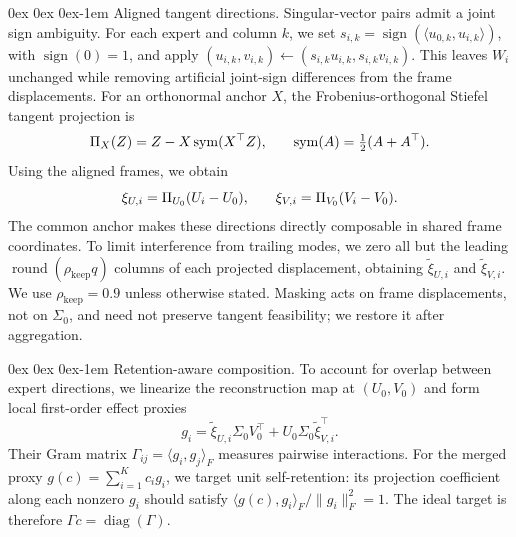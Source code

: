 \documentclass[11pt, a4paper]{utda}
\makeatletter
\renewcommand{\paragraph}{%
  \@startsection{paragraph}{4}%
  {\z@}{0ex \@plus 0ex \@minus 0ex}{-1em}%
  {\normalfont\normalsize\bfseries}%
}
\theoremstyle{plain}
\theoremstyle{definition}
\theoremstyle{remark}
\makeatother
\begin{document}
\paragraph{Aligned tangent directions.}
Singular-vector pairs admit a joint sign ambiguity.
For each expert and column $k$, we set
$s_{i,k}=\operatorname{sign}(\langle u_{0,k},u_{i,k}\rangle)$,
with $\operatorname{sign}(0)=1$, and apply
$(u_{i,k},v_{i,k})\leftarrow
(s_{i,k}u_{i,k},s_{i,k}v_{i,k})$.
This leaves $W_i$ unchanged while removing artificial joint-sign
differences from the frame displacements.
For an orthonormal anchor $X$, the Frobenius-orthogonal
Stiefel tangent projection is
\begin{equation}
\small
\label{eq:iso_main_tangent_projection}
    \Pi_X(Z)=Z-X\operatorname{sym}(X^\top Z),
    \qquad
    \operatorname{sym}(A)=\tfrac12(A+A^\top).
\end{equation}
Using the aligned frames, we obtain
\begin{equation}
\small
\label{eq:iso_merger_tangent_directions}
    \xi_{U,i}=\Pi_{U_0}(U_i-U_0),
    \qquad
    \xi_{V,i}=\Pi_{V_0}(V_i-V_0).
\end{equation}
The common anchor makes these directions directly composable
in shared frame coordinates.
To limit interference from trailing modes, we zero all but the
leading $\operatorname{round}(\rho_{\mathrm{keep}}q)$ columns
of each projected displacement, obtaining
$\widetilde\xi_{U,i}$ and $\widetilde\xi_{V,i}$.
We use $\rho_{\mathrm{keep}}=0.9$ unless otherwise stated.
Masking acts on frame displacements, not on $\Sigma_0$,
and need not preserve tangent feasibility; we restore it
after aggregation.

\paragraph{Retention-aware composition.}
To account for overlap between expert directions, we linearize
the reconstruction map at $(U_0,V_0)$ and form local
first-order effect proxies
\begin{equation}
\label{eq:iso_merger_effect_proxy}
    g_i=\widetilde\xi_{U,i}\Sigma_0V_0^\top
        +U_0\Sigma_0\widetilde\xi_{V,i}^\top.
\end{equation}
Their Gram matrix
$\Gamma_{ij}=\langle g_i,g_j\rangle_F$
measures pairwise interactions.
For the merged proxy $g(c)=\sum_{i=1}^{K}c_i g_i$, we target
unit self-retention: its projection coefficient along each
nonzero $g_i$ should satisfy
$\langle g(c),g_i\rangle_F/\|g_i\|_F^2=1$.
The ideal target is therefore
$\Gamma c=\operatorname{diag}(\Gamma)$.
\end{document}
